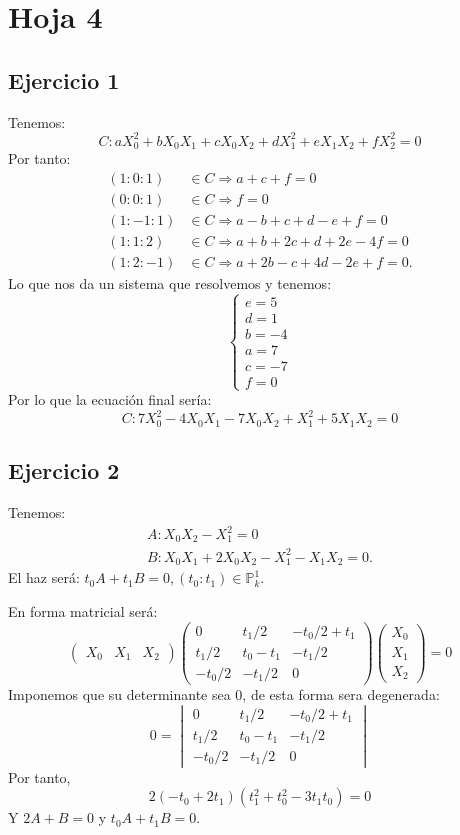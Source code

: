 \documentclass[10pt,a4paper,openright]{book}
\theoremstyle{break}
\begin{document}
\chapter{Hoja 4}%
\label{cha:hoja_4}
\section{Ejercicio 1}%
\label{sec:ejercicio_1_4}
Tenemos:
\[
C : aX_0^2 + bX_0 X_1 + cX_0X_2 + dX_1^2 + eX_1X_2 + fX_2^2 = 0
\]
Por tanto:
\begin{align*}
    \left( 1 : 0 : 1 \right) &\in C \Rightarrow a + c + f = 0\\
    \left( 0 : 0 : 1 \right) &\in C \Rightarrow f = 0\\
    \left( 1 : -1 : 1 \right) &\in C \Rightarrow a - b + c + d - e + f = 0\\
    \left( 1 : 1 : 2 \right) &\in C \Rightarrow a + b + 2c + d + 2e - 4f = 0\\
    \left( 1 : 2 : -1 \right) &\in C \Rightarrow a + 2b - c + 4d - 2e + f = 0
.\end{align*}
Lo que nos da un sistema que resolvemos y tenemos:
\[
\begin{cases}
   e = 5\\
   d = 1\\
   b = -4\\
   a = 7\\
   c = -7\\
   f = 0
\end{cases} 
\]
Por lo que la ecuación final sería:
\[
C : 7X_0^2 - 4X_0X_1 - 7X_0X_2 + X_1^2 + 5X_1X_2 = 0
\]

\section{Ejercicio 2}%
\label{sec:ejercicio_2_4}
Tenemos:
\begin{align*}
A : X_0X_2 - X_1^2 = 0\\
B : X_0X_1 + 2X_0X_2 - X_1^2 - X_1X_2 = 0   
.\end{align*}
El haz será: $t_0A + t_1B = 0, \left( t_0 : t_1 \right) \in \mathbb{P}^{1}_{k}$.

En forma matricial será:
\[
    \begin{pmatrix} X_0 & X_1 & X_2 \end{pmatrix} \begin{pmatrix} 0 & t_1/2 & -t_0/2 + t_1\\
t_1/2 & t_0 - t_1 & -t_1/2\\
-t_0/2 & -t_1/2 & 0\end{pmatrix} \begin{pmatrix} X_0\\ X_1\\ X_2 \end{pmatrix} = 0
\]
Imponemos que su determinante sea $0$, de esta forma sera degenerada:
\[
0 = \begin{vmatrix} 0 & t_1/2 & -t_0/2 + t_1\\
t_1/2 & t_0 - t_1 & -t_1/2\\
-t_0/2 & -t_1/2 & 0 \end{vmatrix} 
\]
Por tanto, 
\[
2 \left( -t_0 + 2t_1 \right) \left( t_1^2 + t_0^2 - 3t_1t_0 \right) = 0
\]
Y $2A + B = 0$ y $t_0A + t_1B = 0$.
\end{document}
